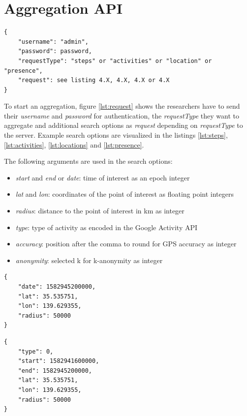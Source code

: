 \section{Aggregation API}

\begin{lstlisting}[caption=Initial aggregation request from researcher, label={lst:request}]
{
    "username": "admin",
    "password": password,
    "requestType": "steps" or "activities" or "location" or "presence",
    "request": see listing 4.X, 4.X, 4.X or 4.X
}
\end{lstlisting}

To start an aggregation, figure \ref{lst:request} shows the researchers have to send their \textit{username} and \textit{password} for authentication, the \textit{requestType} they want to aggregate and additional search options as \textit{request} depending on \textit{requestType} to the server. Example search options are visualized in the listings \ref{lst:steps}, \ref{lst:activities}, \ref{lst:locations} and \ref{lst:presence}.

The following arguments are used in the search options:
\begin{itemize}
    \item \textit{start} and \textit{end} or \textit{date}: time of interest as an epoch integer
    \item \textit{lat} and \textit{lon}: coordinates of the point of interest as floating point integers
    \item \textit{radius}: distance to the point of interest in km as integer
    \item \textit{type}: type of activity as encoded in the Google Activity API
    \item \textit{accuracy}: position after the comma to round for GPS accuracy as integer
    \item \textit{anonymity}: selected k for k-anonymity as integer
\end{itemize}

\begin{lstlisting}[caption=Search options for steps, label={lst:steps}]
{
    "date": 1582945200000,
    "lat": 35.535751,
    "lon": 139.629355,
    "radius": 50000
}
\end{lstlisting}

\begin{lstlisting}[caption=Search options for activities, label={lst:activities}]
{
    "type": 0,
    "start": 1582941600000,
    "end": 1582945200000,
    "lat": 35.535751,
    "lon": 139.629355,
    "radius": 50000
}
\end{lstlisting}


